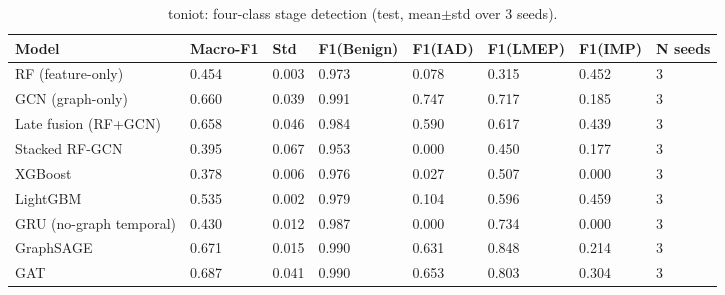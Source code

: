 \begin{table}[t]
\centering
\caption{toniot: four-class stage detection (test, mean$\pm$std over 3 seeds).}
\label{tab:toniot_stage_detection}
\begin{tabular}{llllllll}
\toprule
Model & Macro-F1 & Std & F1(Benign) & F1(IAD) & F1(LMEP) & F1(IMP) & N seeds \\
\midrule
RF (feature-only) & 0.454 & 0.003 & 0.973 & 0.078 & 0.315 & 0.452 & 3 \\
GCN (graph-only) & 0.660 & 0.039 & 0.991 & 0.747 & 0.717 & 0.185 & 3 \\
Late fusion (RF+GCN) & 0.658 & 0.046 & 0.984 & 0.590 & 0.617 & 0.439 & 3 \\
Stacked RF-GCN & 0.395 & 0.067 & 0.953 & 0.000 & 0.450 & 0.177 & 3 \\
XGBoost & 0.378 & 0.006 & 0.976 & 0.027 & 0.507 & 0.000 & 3 \\
LightGBM & 0.535 & 0.002 & 0.979 & 0.104 & 0.596 & 0.459 & 3 \\
GRU (no-graph temporal) & 0.430 & 0.012 & 0.987 & 0.000 & 0.734 & 0.000 & 3 \\
GraphSAGE & 0.671 & 0.015 & 0.990 & 0.631 & 0.848 & 0.214 & 3 \\
GAT & 0.687 & 0.041 & 0.990 & 0.653 & 0.803 & 0.304 & 3 \\
\bottomrule
\end{tabular}
\end{table}
